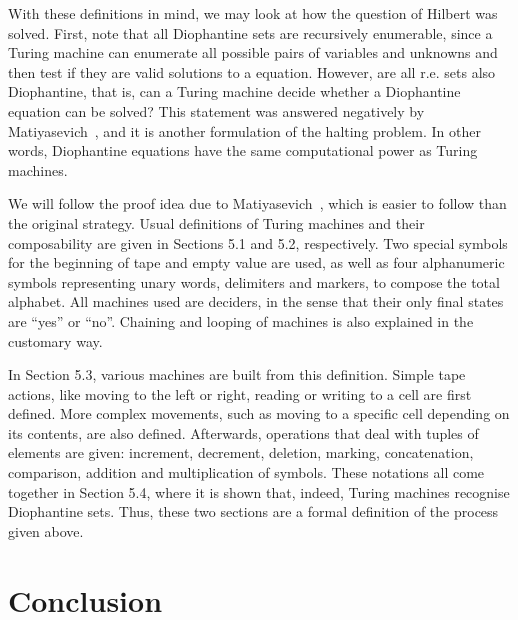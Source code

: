 \documentclass[12pt]{article}
\begin{document}
With these definitions in mind, we may look at how the question of Hilbert was solved. First, note that all Diophantine sets are recursively enumerable, since a Turing machine can enumerate all possible pairs of variables and unknowns and then test if they are valid solutions to a equation. However, are all r.e. sets also Diophantine, that is, can a Turing machine decide whether a Diophantine equation can be solved? This statement was answered negatively by Matiyasevich~\cite{}, and it is another formulation of the halting problem. In other words, Diophantine equations have the same computational power as Turing machines.

We will follow the proof idea due to Matiyasevich~\cite[Chap. 5]{}, which is easier to follow than the original strategy. Usual definitions of Turing machines and their composability are given in Sections 5.1 and 5.2, respectively. Two special symbols for the beginning of tape and empty value are used, as well as four alphanumeric symbols representing unary words, delimiters and markers, to compose the total alphabet. All machines used are deciders, in the sense that their only final states are ``yes'' or ``no''. Chaining and looping of machines is also explained in the customary way.

In Section 5.3, various machines are built from this definition. Simple tape actions, like moving to the left or right, reading or writing to a cell are first defined. More complex movements, such as moving to a specific cell depending on its contents, are also defined. Afterwards, operations that deal with tuples of elements are given: increment, decrement, deletion, marking, concatenation, comparison, addition and multiplication of symbols. These notations all come together in Section 5.4, where it is shown that, indeed, Turing machines recognise Diophantine sets. Thus, these two sections are a formal definition of the process given above.



\section{Conclusion}\label{sec:conc}



\end{document}
